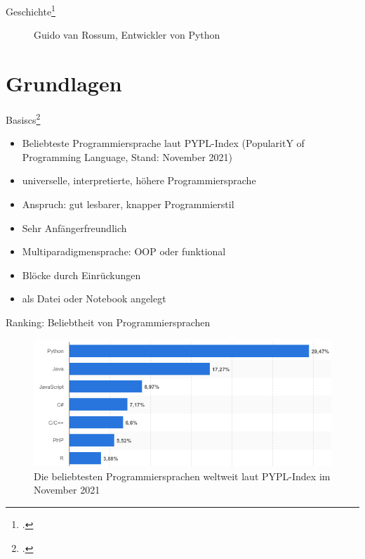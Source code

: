 \documentclass[10pt,ngerman]{beamer}
\begin{document}
\begin{frame}[fragile]{Geschichte\footcite{wiki:python}}
\begin{minipage}[t]{0.29\textwidth}
\begin{figure}
      \caption[Guido van Rossum, https://upload.wikimedia.org/wikipedia/commons/c/c6/Guido_van_Rossum.jpg, abgerufen am 16.11.2021 ]{Guido van Rossum, Entwickler von Python}
    \end{figure}
  \end{minipage}
\end{frame}

\section{Grundlagen}

\begin{frame}[fragile]{Basiscs\footcite{wiki:python}}
  \begin{itemize}
    \item Beliebteste Programmiersprache laut PYPL-Index (PopularitY of Programming Language, Stand: November 2021)
    \item universelle, interpretierte, höhere Programmiersprache
    \item Anspruch: gut lesbarer, knapper Programmierstil
    \item Sehr Anfängerfreundlich
    \item Multiparadigmensprache: OOP oder funktional
    \item Blöcke durch Einrückungen
    \item als Datei oder Notebook angelegt
  \end{itemize}
\end{frame}

\begin{frame}[fragile]{Ranking: Beliebtheit von Programmiersprachen}
  \begin{figure}
    \centering
    \includegraphics[width=1\textwidth]{pictures/statista_ranking.png}
    \caption[Beliebtesten Programmiersprachen, https://de.statista.com/statistik/daten/studie/678732/umfrage/beliebteste-programmiersprachen-weltweit-laut-pypl-index/\#professional, abgerufen am 16.11.2021 ]{Die beliebtesten Programmiersprachen weltweit laut PYPL-Index im November 2021}
  \end{figure}
\end{frame}
\end{document}

